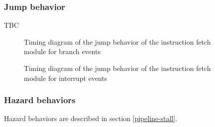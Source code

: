     \subsubsection{Jump behavior}

      \begin{content}
          TBC
        \end{content}

      \begin{figure}[H]
          \centering
          
          \caption{Timing diagram of the jump behavior of the instruction fetch module for branch events}
          \label{fig:ifm-behavior-branch}
        \end{figure}

      \begin{figure}[H]
          \centering
          
          \caption{Timing diagram of the jump behavior of the instruction fetch module for interrupt events}
          \label{fig:ifm-behavior-interrupt}
        \end{figure}

    \subsubsection{Hazard behaviors}

      \begin{content}
          Hazard behaviors are described in section \ref{pipeline-stall}.
        \end{content}

\newpage

